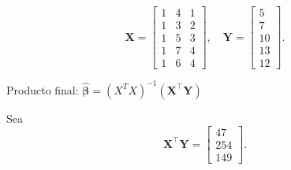 \documentclass[10pt,a4paper]{article}
\begin{document}
\begin{enumerate}
\[
\mathbf{X}
=
\begin{bmatrix}
1 & 4 & 1\\
1 & 3 & 2\\
1 & 5 & 3\\
1 & 7 & 4\\
1 & 6 & 4
\end{bmatrix},
\quad
\mathbf{Y}
=
\begin{bmatrix}
5\\
7\\
10\\
13\\
12
\end{bmatrix}.
\]



{Producto final: $\hat{\boldsymbol{\beta}} = (X^TX)^{-1}(\mathbf{X}^\top \mathbf{Y})$}

Sea
\[
\mathbf{X}^\top \mathbf{Y}
=
\begin{bmatrix}
47\\
254\\
149
\end{bmatrix}.
\]


\end{enumerate}
\end{document}
